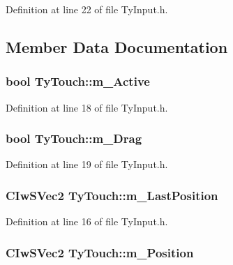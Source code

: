 Definition at line 22 of file TyInput.h.



\subsection{Member Data Documentation}
\hypertarget{struct_ty_touch_a6a5681333e2c46e7b66a22450f24f554}{
\subsubsection[{m\_\-Active}]{\setlength{\rightskip}{0pt plus 5cm}bool {\bf TyTouch::m\_\-Active}}}
\label{struct_ty_touch_a6a5681333e2c46e7b66a22450f24f554}


Definition at line 18 of file TyInput.h.

\hypertarget{struct_ty_touch_a611b3e001de8ebd7303ad886f68bdbde}{
\subsubsection[{m\_\-Drag}]{\setlength{\rightskip}{0pt plus 5cm}bool {\bf TyTouch::m\_\-Drag}}}
\label{struct_ty_touch_a611b3e001de8ebd7303ad886f68bdbde}


Definition at line 19 of file TyInput.h.

\hypertarget{struct_ty_touch_a8254bbfdb0344afc53407c212f455b1b}{
\subsubsection[{m\_\-LastPosition}]{\setlength{\rightskip}{0pt plus 5cm}CIwSVec2 {\bf TyTouch::m\_\-LastPosition}}}
\label{struct_ty_touch_a8254bbfdb0344afc53407c212f455b1b}


Definition at line 16 of file TyInput.h.

\hypertarget{struct_ty_touch_a2ba48f841ba2429689b8c01a99f6e19f}{
\subsubsection[{m\_\-Position}]{\setlength{\rightskip}{0pt plus 5cm}CIwSVec2 {\bf TyTouch::m\_\-Position}}}
\label{struct_ty_touch_a2ba48f841ba2429689b8c01a99f6e19f}


